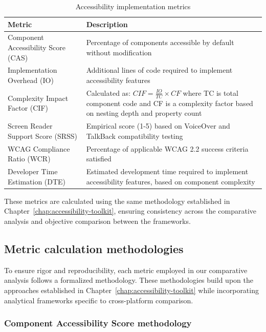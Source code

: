 \begin{table}[ht]
\caption{Accessibility implementation metrics}
\label{tab:accessibility_metrics}
\centering
\begin{tabular}{|P{4cm}|P{10cm}|}
\hline
\textbf{Metric} & \textbf{Description} \\
\hline
Component Accessibility Score (CAS) & Percentage of components accessible by default without modification \\
\hline
Implementation Overhead (IO) & Additional lines of code required to implement accessibility features \\
\hline
Complexity Impact Factor (CIF) & Calculated as: $CIF = \frac{IO}{TC} \times CF$ where TC is total component code and CF is a complexity factor based on nesting depth and property count \\
\hline
Screen Reader Support Score (SRSS) & Empirical score (1-5) based on VoiceOver and TalkBack compatibility testing \\
\hline
WCAG Compliance Ratio (WCR) & Percentage of applicable WCAG 2.2 success criteria satisfied \\
\hline
Developer Time Estimation (DTE) & Estimated development time required to implement accessibility features, based on component complexity \\
\hline
\end{tabular}
\end{table}

These metrics are calculated using the same methodology established in Chapter~\ref{chap:accessibility-toolkit}, ensuring consistency across the comparative analysis and objective comparison between the frameworks.

\subsection{Metric calculation methodologies}
\label{subsec:metric-methodologies}

To ensure rigor and reproducibility, each metric employed in our comparative analysis follows a formalized methodology. These methodologies build upon the approaches established in Chapter~\ref{chap:accessibility-toolkit} while incorporating analytical frameworks specific to cross-platform comparison.

\subsubsection{Component Accessibility Score methodology}
\label{subsubsec:cas-methodology}

